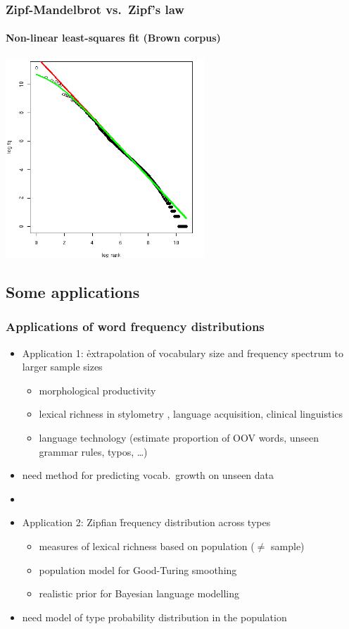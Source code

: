 \documentclass[t]{beamer} %
\begin{document}
\begin{frame}
  \frametitle{Zipf-Mandelbrot vs.\ Zipf's law} 
  \framesubtitle{Non-linear least-squares fit (Brown corpus)}

  \ungap[1.5]
  \begin{center}
    \includegraphics[height=7.5cm]{img/brown-zipf-man-rf}
  \end{center}
\end{frame}

\subsection{Some applications}

\begin{frame}
  \frametitle{Applications of word frequency distributions}

  \begin{itemize}
  \item Application 1: \h{extrapolation} of vocabulary size and
    frequency spectrum to larger sample sizes
    \begin{itemize}
    \item morphological productivity \citep[e.g.][]{Luedeling:Evert:05}
    \item lexical richness in stylometry \citep{Efron:Thisted:76}, language acquisition, clinical linguistics \citep{Garrard:etc:05}
    \item language technology (estimate proportion of OOV words, unseen grammar rules, typos, \ldots)
    \end{itemize}
  \item[\hand] need method for predicting vocab.\ growth on unseen data
  \item[]\pause
  \item Application 2: Zipfian \h{frequency distribution} across types
    \begin{itemize}
    \item measures of lexical richness based on population ($\neq$ sample)
    \item population model for Good-Turing smoothing \citep{Good:53,Gale:Sampson:95}
    \item realistic prior for Bayesian language modelling
    \end{itemize}
  \item[\hand] need model of type probability distribution in the population
  \end{itemize}
\end{frame}
\end{document}
